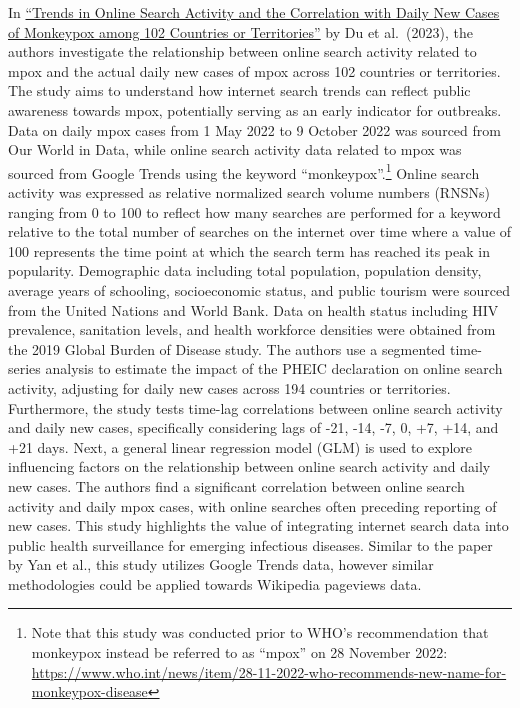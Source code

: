 \documentclass[
  12pt,
]{article}
\begin{document}
In \href{https://doi.org/10.3390/ijerph20043395}{``Trends in Online
Search Activity and the Correlation with Daily New Cases of Monkeypox
among 102 Countries or Territories''} by Du et al.~(2023), the authors
investigate the relationship between online search activity related to
mpox and the actual daily new cases of mpox across 102 countries or
territories. The study aims to understand how internet search trends can
reflect public awareness towards mpox, potentially serving as an early
indicator for outbreaks. Data on daily mpox cases from 1 May 2022 to 9
October 2022 was sourced from Our World in Data, while online search
activity data related to mpox was sourced from Google Trends using the
keyword ``monkeypox''.\footnote{Note that this study was conducted prior
  to WHO's recommendation that monkeypox instead be referred to as
  ``mpox'' on 28 November 2022:
  \url{https://www.who.int/news/item/28-11-2022-who-recommends-new-name-for-monkeypox-disease}}
Online search activity was expressed as relative normalized search
volume numbers (RNSNs) ranging from 0 to 100 to reflect how many
searches are performed for a keyword relative to the total number of
searches on the internet over time where a value of 100 represents the
time point at which the search term has reached its peak in popularity.
Demographic data including total population, population density, average
years of schooling, socioeconomic status, and public tourism were
sourced from the United Nations and World Bank. Data on health status
including HIV prevalence, sanitation levels, and health workforce
densities were obtained from the 2019 Global Burden of Disease study.
The authors use a segmented time-series analysis to estimate the impact
of the PHEIC declaration on online search activity, adjusting for daily
new cases across 194 countries or territories. Furthermore, the study
tests time-lag correlations between online search activity and daily new
cases, specifically considering lags of -21, -14, -7, 0, +7, +14, and
+21 days. Next, a general linear regression model (GLM) is used to
explore influencing factors on the relationship between online search
activity and daily new cases. The authors find a significant correlation
between online search activity and daily mpox cases, with online
searches often preceding reporting of new cases. This study highlights
the value of integrating internet search data into public health
surveillance for emerging infectious diseases. Similar to the paper by
Yan et al., this study utilizes Google Trends data, however similar
methodologies could be applied towards Wikipedia pageviews data.
\end{document}
